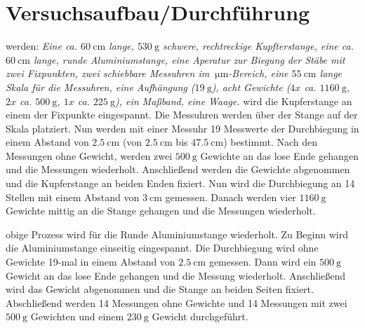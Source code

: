 
\section{Versuchsaufbau/Durchführung}\justifying

\justifying werden: \textit{ Eine ca. $\SI{60}{\centi\meter}$ lange, $\SI{530}{\gram}$ schwere, rechtreckige Kupfterstange, eine ca. $\SI{60}{\centi\meter}$ lange, runde
Aluminiumstange, eine Aperatur zur Biegung der Stäbe mit zwei Fixpunkten, zwei schiebbare Messuhren im $\SI{}{\micro\meter}$-Bereich, eine
$\SI{55}{\centi\meter}$ lange Skala für die Messuhren, eine Aufhängung ($\SI{19}{\gram}$), acht Gewichte ($4x$ ca. $\SI{1160}{\gram}$, 
$2x$ ca. $\SI{500}{\gram}$, $1x$ ca. $\SI{225}{\gram}$), ein Maßband, eine Waage.
}
\justifying wird die Kupferstange an einem der Fixpunkte eingespannt. Die Messuhren werden über der Stange auf der Skala platziert. Nun werden mit 
einer Messuhr 19 Messwerte der Durchbiegung in einem Abstand von $\SI{2.5}{\centi\meter}$ (von $\SI{2.5}{\centi\meter}$ bis $\SI{47.5}{\centi\meter}$) 
bestimmt. Nach den Messungen ohne Gewicht, werden zwei $\SI{500}{\gram}$ Gewichte an das lose Ende gehangen und die Messungen wiederholt. Anschließend
werden die Gewichte abgenommen und die Kupferstange an beiden Enden fixiert. Nun wird die Durchbiegung an 14 Stellen mit einem Abstand von 
$\SI{3}{\centi\meter}$ gemessen. Danach werden vier $\SI{1160}{\gram}$ Gewichte mittig an die Stange gehangen und die Messungen wiederholt. 

\justifying obige Prozess wird für die Runde Aluminiumstange wiederholt. Zu Beginn wird die Aluminiumstange einseitig eingespannt. Die Durchbiegung
wird ohne Gewichte 19-mal in einem Abstand von $\SI{2.5}{\centi\meter}$ gemessen. Dann wird ein $\SI{500}{\gram}$ Gewicht an das lose Ende 
gehangen und die Messung wiederholt. Anschließend wird das Gewicht abgenommen und die Stange an beiden Seiten fixiert. Abschließend werden 
14 Messungen ohne Gewichte und 14 Messungen mit zwei $\SI{500}{\gram}$ Gewichten und einem $\SI{230}{\gram}$ Gewicht durchgeführt.


